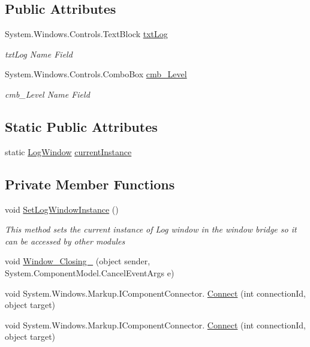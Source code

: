 \subsection*{Public Attributes}
\begin{DoxyCompactItemize}
\item 
System.\+Windows.\+Controls.\+Text\+Block \hyperlink{class_c_p_u___o_s___simulator_1_1_log_window_adf5b9516057f4453c1646bc12982d979}{txt\+Log}
\begin{DoxyCompactList}\small\item\em txt\+Log Name Field \end{DoxyCompactList}\item 
System.\+Windows.\+Controls.\+Combo\+Box \hyperlink{class_c_p_u___o_s___simulator_1_1_log_window_ab3161bb03e1bb1901d1c8772a25d2e45}{cmb\+\_\+\+Level}
\begin{DoxyCompactList}\small\item\em cmb\+\_\+\+Level Name Field \end{DoxyCompactList}\end{DoxyCompactItemize}
\subsection*{Static Public Attributes}
\begin{DoxyCompactItemize}
\item 
static \hyperlink{class_c_p_u___o_s___simulator_1_1_log_window}{Log\+Window} \hyperlink{class_c_p_u___o_s___simulator_1_1_log_window_ae888c936335930faf46e6a121b0a34ac}{current\+Instance}
\end{DoxyCompactItemize}
\subsection*{Private Member Functions}
\begin{DoxyCompactItemize}
\item 
void \hyperlink{class_c_p_u___o_s___simulator_1_1_log_window_a757990f2947b4f55c2ff22c569df581c}{Set\+Log\+Window\+Instance} ()
\begin{DoxyCompactList}\small\item\em This method sets the current instance of Log window in the window bridge so it can be accessed by other modules \end{DoxyCompactList}\item 
void \hyperlink{class_c_p_u___o_s___simulator_1_1_log_window_a8db379c608877698f5473fba6f16a578}{Window\+\_\+\+Closing\+\_} (object sender, System.\+Component\+Model.\+Cancel\+Event\+Args e)
\item 
void System.\+Windows.\+Markup.\+I\+Component\+Connector. \hyperlink{class_c_p_u___o_s___simulator_1_1_log_window_ab12561b4034de76e81f55d236557e294}{Connect} (int connection\+Id, object target)
\item 
void System.\+Windows.\+Markup.\+I\+Component\+Connector. \hyperlink{class_c_p_u___o_s___simulator_1_1_log_window_ab12561b4034de76e81f55d236557e294}{Connect} (int connection\+Id, object target)
\end{DoxyCompactItemize}
